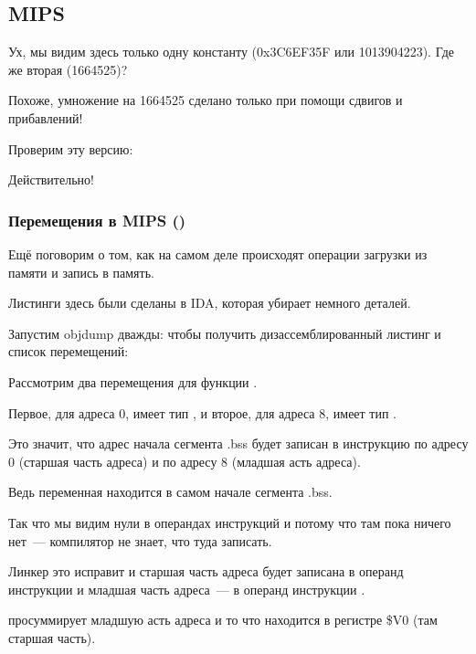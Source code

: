 \subsection{MIPS}



Ух, мы видим здесь только одну константу (0x3C6EF35F или 1013904223).
Где же вторая (1664525)?

Похоже, умножение на 1664525 сделано только при помощи сдвигов и прибавлений!

Проверим эту версию:





Действительно!

\subsubsection{Перемещения в MIPS ()}

Ещё поговорим о том, как на самом деле происходят операции загрузки из памяти и запись в память.

Листинги здесь были сделаны в IDA, которая убирает немного деталей.

Запустим objdump дважды: чтобы получить дизассемблированный листинг и список перемещений:



Рассмотрим два перемещения для функции .

Первое, для адреса 0, имеет тип , и второе, для адреса 8, имеет тип .

Это значит, что адрес начала сегмента .bss будет записан в инструкцию по адресу 0 (старшая часть адреса)
и по адресу 8 (младшая асть адреса).

Ведь переменная  находится в самом начале сегмента .bss.

Так что мы видим нули в операндах инструкций \LUI и \SW потому что там пока ничего нет~--- 
компилятор не знает, что туда записать.

Линкер это исправит и старшая часть адреса будет записана в операнд инструкции \LUI и младшая часть адреса~---
в операнд инструкции \SW.

\SW просуммирует младшую асть адреса и то что находится в регистре \$V0 (там старшая часть).

